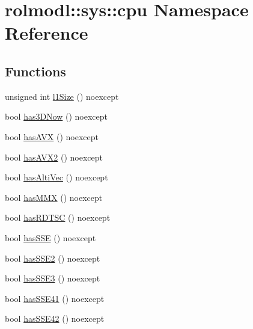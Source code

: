 \hypertarget{namespacerolmodl_1_1sys_1_1cpu}{}\section{rolmodl\+::sys\+::cpu Namespace Reference}
\label{namespacerolmodl_1_1sys_1_1cpu}
\subsection*{Functions}
\begin{DoxyCompactItemize}
\item 
unsigned int \mbox{\hyperlink{namespacerolmodl_1_1sys_1_1cpu_ad98e620f999f2f80c6eda9f191d3453e}{l1\+Size}} () noexcept
\item 
bool \mbox{\hyperlink{namespacerolmodl_1_1sys_1_1cpu_aff7e256df3cbeae474e4c64893544afb}{has3\+D\+Now}} () noexcept
\item 
bool \mbox{\hyperlink{namespacerolmodl_1_1sys_1_1cpu_a872c2351d54168bee9e7fbd649915546}{has\+A\+VX}} () noexcept
\item 
bool \mbox{\hyperlink{namespacerolmodl_1_1sys_1_1cpu_a1eabddb9c18dd8feff43773589cf4fcb}{has\+A\+V\+X2}} () noexcept
\item 
bool \mbox{\hyperlink{namespacerolmodl_1_1sys_1_1cpu_a314ab3cc20eb23538ccb57c4d0589beb}{has\+Alti\+Vec}} () noexcept
\item 
bool \mbox{\hyperlink{namespacerolmodl_1_1sys_1_1cpu_a3dab852b21f17995c8e1c3f9b5a56dfa}{has\+M\+MX}} () noexcept
\item 
bool \mbox{\hyperlink{namespacerolmodl_1_1sys_1_1cpu_a87cea05fb8dec9396eee8147e1cd239b}{has\+R\+D\+T\+SC}} () noexcept
\item 
bool \mbox{\hyperlink{namespacerolmodl_1_1sys_1_1cpu_a4486fdd3d0f3e4a8e7be04a630bcb244}{has\+S\+SE}} () noexcept
\item 
bool \mbox{\hyperlink{namespacerolmodl_1_1sys_1_1cpu_a9924bd370ff28059cce71ae90ac116fd}{has\+S\+S\+E2}} () noexcept
\item 
bool \mbox{\hyperlink{namespacerolmodl_1_1sys_1_1cpu_a8c1b85a95b0e010ed12e98385e66daa4}{has\+S\+S\+E3}} () noexcept
\item 
bool \mbox{\hyperlink{namespacerolmodl_1_1sys_1_1cpu_a4ff9c70551b00e25009df29293b1a730}{has\+S\+S\+E41}} () noexcept
\item 
bool \mbox{\hyperlink{namespacerolmodl_1_1sys_1_1cpu_a65d1da04b578f34d55ec5470d315bce3}{has\+S\+S\+E42}} () noexcept
\end{DoxyCompactItemize}



